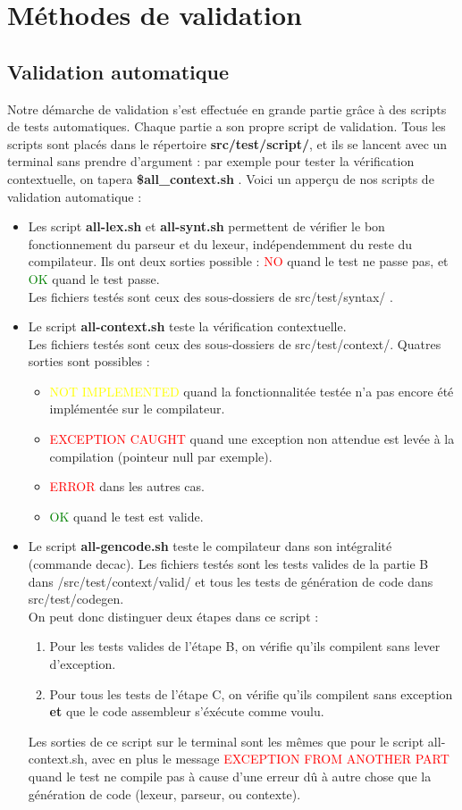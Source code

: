 \documentclass[11pt]{article}
\begin{document}
\section{Méthodes de validation}
\subsection{Validation automatique}
Notre démarche de validation s'est effectuée en grande partie grâce à des scripts de tests automatiques. Chaque partie a son propre script de validation. Tous les scripts sont placés dans le répertoire \textbf{src/test/script/}, et ils se lancent avec un terminal sans prendre d'argument : par exemple pour tester la vérification contextuelle, on tapera \textbf{\$all\_context.sh} . Voici un apperçu de nos scripts de validation automatique :
\begin{itemize}
\item Les script \textbf{all-lex.sh} et \textbf{all-synt.sh} permettent de vérifier le bon fonctionnement du parseur et du lexeur, indépendemment du reste du compilateur. Ils ont deux sorties possible : \textcolor{red}{NO} quand le test ne passe pas, et \textcolor{green}{OK} quand le test passe.\\
Les fichiers testés sont ceux des sous-dossiers de src/test/syntax/ .
\item Le script \textbf{all-context.sh} teste la vérification contextuelle. \\
Les fichiers testés sont ceux des sous-dossiers de src/test/context/. Quatres sorties sont possibles : 
\begin{itemize}
\item \textcolor{yellow}{NOT IMPLEMENTED} quand la fonctionnalitée testée n'a pas encore été implémentée sur le compilateur.
\item \textcolor{red}{EXCEPTION CAUGHT} quand une exception non attendue est levée à la compilation (pointeur null par exemple).
\item \textcolor{red}{ERROR} dans les autres cas.
\item \textcolor{green}{OK} quand le test est valide.
\end{itemize}
\item Le script \textbf{all-gencode.sh} teste le compilateur dans son intégralité (commande decac). Les fichiers testés sont les tests valides de la partie B dans /src/test/context/valid/ et tous les tests de génération de code dans src/test/codegen.  \\
On peut donc distinguer deux étapes dans ce script :
\begin{enumerate}
\item Pour les tests valides de l'étape B, on vérifie qu'ils compilent sans lever d'exception.
\item Pour tous les tests de l'étape C, on vérifie qu'ils compilent sans exception \textbf{et} que le code assembleur s'éxécute comme voulu.
\end{enumerate}
Les sorties de ce script sur le terminal sont les mêmes que pour le script all-context.sh, avec en plus  le message 
 \textcolor{red}{EXCEPTION FROM ANOTHER PART} quand le test ne compile pas à cause d'une erreur dû à autre chose que la génération de code (lexeur, parseur, ou contexte).


\end{itemize}
\end{document}
